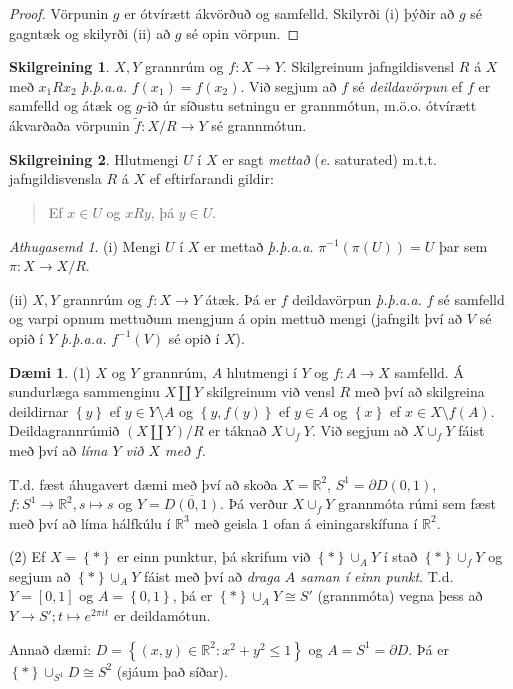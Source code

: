 \documentclass[a4paper,icelandic]{book}
\theoremstyle{definition}
\newtheorem{skilgr}{Skilgreining}[section]
\newtheorem{daemi}{Dæmi}[section]
\theoremstyle{plain}
\theoremstyle{remark}
\newtheorem*{ath}{Athugasemd}
\newcommand{\R}{\mathbb{R}} %
\begin{document}
\begin{proof}
  Vörpunin $g$ er ótvírætt ákvörðuð og samfelld. Skilyrði (i) þýðir að
  $g$ sé gagntæk og skilyrði (ii) að $g$ sé opin vörpun. 
\end{proof}
\begin{skilgr}
  $X,Y$ grannrúm og $f:X\to Y$. Skilgreinum jafngildisvensl $R$ á $X$ með
  $x_1 R x_2$ \emph{þ.þ.a.a.} $f(x_1)=f(x_2)$. Við segjum að $f$ sé
  \emph{deildavörpun} ef $f$ er samfelld og átæk og
  $g$-ið úr síðustu setningu er grannmótun, m.ö.o. ótvírætt ákvarðaða vörpunin
  $\tilde f:X/R\to Y$ sé grannmótun. 
\end{skilgr}
\begin{skilgr}
  Hlutmengi $U$ í $X$ er sagt \emph{mettað} (\emph{e}.
  saturated) m.t.t. jafngildisvensla $R$ á $X$ ef eftirfarandi gildir:
  \begin{quote}
    Ef $x\in U$ og $xRy$, þá $y\in U$.
  \end{quote}
\end{skilgr}
\begin{ath}
  (i) Mengi $U$ í $X$ er mettað \emph{þ.þ.a.a.} $\pi^{-1}(\pi(U))=U$ þar sem
  $\pi:X\to X/R$.

  (ii) $X,Y$ grannrúm og $f:X\to Y$ átæk. Þá er $f$ deildavörpun \emph{þ.þ.a.a.}
  $f$ sé samfelld og varpi opnum mettuðum mengjum á opin mettuð mengi (jafngilt
  því að $V$ sé opið í $Y$ \emph{þ.þ.a.a.} $f^{-1}(V)$ sé opið í $X$).
\end{ath}
\begin{daemi}
  (1) $X$ og $Y$ grannrúm, $A$ hlutmengi í $Y$ og $f:A\to X$ samfelld. Á
  sundurlæga sammenginu $X\coprod Y$ skilgreinum við vensl $R$ með því að
  skilgreina deildirnar $\left\{ y \right\}$ ef $y\in Y\setminus A$ og
  $\left\{ y,f(y) \right\}$ ef $y\in A$ og $\left\{ x \right\}$ ef $x\in
  X\setminus f(A)$. Deildagrannrúmið $(X\coprod Y)/R$ er táknað $X\cup_f Y$. Við
  segjum að $X\cup_f Y$ fáist með því að \emph{líma $Y$ við $X$ með $f$}. 

  T.d. fæst áhugavert dæmi með því að skoða $X=\R^2$, $S^1=\partial D(0,1)$,
  $f:S^1\to\R^2, s\mapsto s$ og $Y=\overline{D(0,1)}$. Þá verður $X\cup_f Y$
  grannmóta rúmi sem fæst með því að líma hálfkúlu í $\R^3$ með geisla $1$
  ofan á einingarskífuna í $\R^2$.

  (2) Ef $X = \left\{ * \right\}$ er einn punktur, þá skrifum við $\left\{ *
  \right\}\cup_A Y$ í stað $\left\{ *\right\}\cup_f Y$ og segjum að $\left\{
  * \right\}\cup_A Y$ fáist með því að \emph{draga $A$ saman í einn punkt}. T.d.
  $Y=\left[ 0,1 \right]$ og $A=\left\{ 0,1 \right\}$, þá er $\left\{ *
  \right\}\cup_A Y\cong S'$ (grannmóta) vegna þess að $Y\to S'; t\mapsto
  e^{2\pi it}$ er deildamótun.

  Annað dæmi: $D = \left\{ (x,y)\in\R^2:x^2+y^2 \leq 1 \right\}$ og $A =
  S^1 =\partial D$. Þá er $\left\{ * \right\}\cup_{S^1}D\cong S^2$ (sjáum það
  síðar).
\end{daemi}
\end{document}
